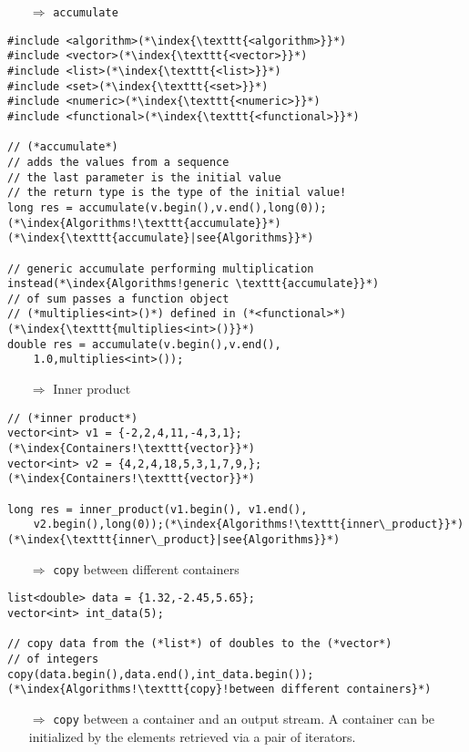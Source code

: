 \documentclass[10pt]{book}
\begin{document}
\begin{enumerate}
\item[$\Rightarrow$] \texttt{accumulate}
\end{enumerate}
\begin{lstlisting}
#include <algorithm>(*\index{\texttt{<algorithm>}}*)
#include <vector>(*\index{\texttt{<vector>}}*)
#include <list>(*\index{\texttt{<list>}}*)
#include <set>(*\index{\texttt{<set>}}*)
#include <numeric>(*\index{\texttt{<numeric>}}*)
#include <functional>(*\index{\texttt{<functional>}}*)

// (*accumulate*)
// adds the values from a sequence
// the last parameter is the initial value
// the return type is the type of the initial value!
long res = accumulate(v.begin(),v.end(),long(0));(*\index{Algorithms!\texttt{accumulate}}*)(*\index{\texttt{accumulate}|see{Algorithms}}*)

// generic accumulate performing multiplication instead(*\index{Algorithms!generic \texttt{accumulate}}*)
// of sum passes a function object
// (*multiplies<int>()*) defined in (*<functional>*)(*\index{\texttt{multiplies<int>()}}*)
double res = accumulate(v.begin(),v.end(),
    1.0,multiplies<int>());
\end{lstlisting}
\begin{enumerate}
\item[$\Rightarrow$]  Inner product
\end{enumerate}
\begin{lstlisting}
// (*inner product*)
vector<int> v1 = {-2,2,4,11,-4,3,1};(*\index{Containers!\texttt{vector}}*)
vector<int> v2 = {4,2,4,18,5,3,1,7,9,};(*\index{Containers!\texttt{vector}}*)

long res = inner_product(v1.begin(), v1.end(),
    v2.begin(),long(0));(*\index{Algorithms!\texttt{inner\_product}}*)(*\index{\texttt{inner\_product}|see{Algorithms}}*)
\end{lstlisting}
\begin{enumerate}
\item[$\Rightarrow$]  \texttt{copy} between different containers
\end{enumerate}
\begin{lstlisting}
list<double> data = {1.32,-2.45,5.65};
vector<int> int_data(5);

// copy data from the (*list*) of doubles to the (*vector*)
// of integers
copy(data.begin(),data.end(),int_data.begin());(*\index{Algorithms!\texttt{copy}!between different containers}*)
\end{lstlisting}
\begin{enumerate}
\item[$\Rightarrow$]  \texttt{copy} between a container and an output stream. A container can be initialized by the elements retrieved via a pair of iterators.
\end{enumerate}
\end{document}
